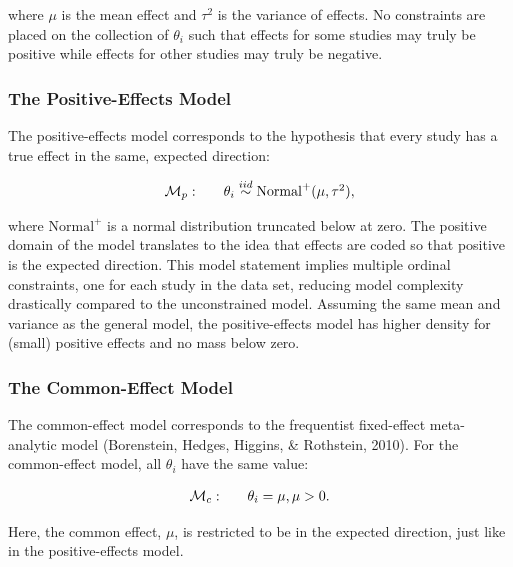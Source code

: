 \documentclass[english,,man]{apa6}
\begin{document}
where \(\mu\) is the mean effect and \(\tau^2\) is the variance of effects. No constraints are placed on the collection of \(\theta_i\) such that effects for some studies may truly be positive while effects for other studies may truly be negative.

\hypertarget{the-positive-effects-model}{%
\subsubsection{The Positive-Effects Model}\label{the-positive-effects-model}}

The positive-effects model corresponds to the hypothesis that every study has a true effect in the same, expected direction:

\[
\begin{array}{llr}
{\cal M}_p: && \theta_i \stackrel{iid}{\sim} \mbox{Normal}^+(\mu,\tau^2),\\
\end{array}
\]

where \(\mbox{Normal}^+\) is a normal distribution truncated below at zero. The positive domain of the model translates to the idea that effects are coded so that positive is the expected direction. This model statement implies multiple ordinal constraints, one for each study in the data set, reducing model complexity drastically compared to the unconstrained model. Assuming the same mean and variance as the general model, the positive-effects model has higher density for (small) positive effects and no mass below zero.

\hypertarget{the-common-effect-model}{%
\subsubsection{The Common-Effect Model}\label{the-common-effect-model}}

The common-effect model corresponds to the frequentist fixed-effect meta-analytic model (Borenstein, Hedges, Higgins, \& Rothstein, 2010). For the common-effect model, all \(\theta_i\) have the same value:

\[
  \begin{array}{llr}
{\cal M}_c: && \theta_i = \mu, \mu > 0.\\
\end{array}
\]

Here, the common effect, \(\mu\), is restricted to be in the expected direction, just like in the positive-effects model.
\end{document}
